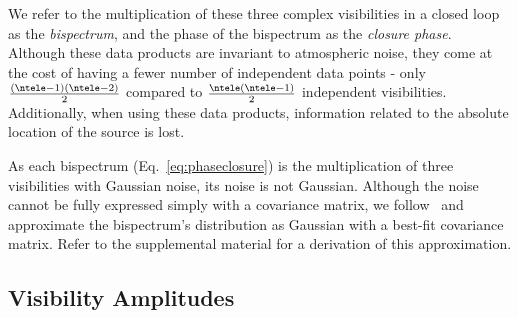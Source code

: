 We refer to the multiplication of these three complex visibilities in a closed loop 
as the {\it bispectrum}, and the phase of the bispectrum %
as the {\it closure phase}.
Although these data products are invariant to atmospheric noise, they come at the cost of having a fewer number of independent data points - only $\frac{(\ntele-1)(\ntele-2)}{2}$ compared to  $\frac{\ntele(\ntele-1)}{2}$ independent visibilities. Additionally, when using these data products, information related to the absolute location of the source is lost. 

As each bispectrum (Eq.~\ref{eq:phaseclosure}) is the multiplication of three visibilities with Gaussian noise, its noise is not Gaussian. 
Although the noise cannot be fully expressed simply with a covariance matrix, we follow~\cite{bouman2016computational} and approximate the bispectrum's distribution as Gaussian with a best-fit covariance matrix.
Refer to the supplemental material for a derivation of this approximation. 




 
 
\vspace{-.1in}
\subsection{Visibility Amplitudes }
\label{sec:visamp}



